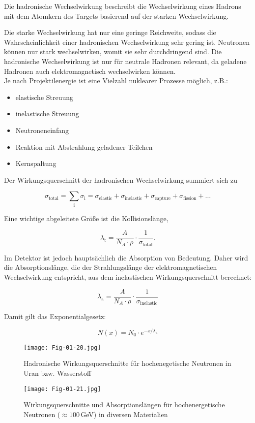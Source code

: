 Die hadronische Wechselwirkung beschreibt die Wechselwirkung eines Hadrons mit dem Atomkern des
Targets basierend auf der starken Wechselwirkung. 

\begin{figure}[H]
		\centering
		
\end{figure}

Die starke Wechselwirkung hat nur eine geringe Reichweite, sodass die Wahrscheinlichkeit einer
hadronischen Wechselwirkung sehr gering ist. Neutronen können nur stark wechselwirken, womit sie
sehr durchdringend sind. Die hadronische Wechselwirkung ist nur für neutrale Hadronen relevant, da
geladene Hadronen auch elektromagnetisch wechselwirken können. 
\\
Je nach Projektilenergie ist eine Vielzahl nuklearer Prozesse möglich, z.B.:

\begin{itemize}
  \item elastische Streuung
  \item inelastische Streuung
  \item Neutroneneinfang
  \item Reaktion mit Abstrahlung geladener Teilchen
  \item Kernspaltung
\end{itemize}

Der Wirkungsquerschnitt der hadronischen Wechselwirkung summiert sich zu

\[\sigma_\text{total} = \sum_\text{i} \sigma_\text{i} = \sigma_\text{elastic}+
\sigma_\text{inelastic}+ \sigma_\text{capture}+ \sigma_\text{fission} +\ldots\]

Eine wichtige abgeleitete Größe ist die Kollisionslänge,

\[ \lambda_\text{t} = \frac{A}{N_A\cdot\rho}\cdot \frac{1}{\sigma_\text{total}}. \]

Im Detektor ist jedoch hauptsächlich die Absorption von Bedeutung. Daher wird die Absorptionslänge,
die der Strahlungslänge der elektromagnetischen Wechselwirkung entspricht, aus dem inelastischen
Wirkungsquerschnitt berechnet:

\[ \lambda_\text{a} =  \frac{A}{N_A\cdot\rho}\cdot \frac{1}{\sigma_\text{inelastic}}\]

Damit gilt das Exponentialgesetz:

\[N(x) = N_0\cdot e^{-x/\lambda_\text{a}} \]

 
\begin{figure}[H]
	\centering
	\texttt{[image: Fig-01-20.jpg]}
	\caption{Hadronische Wirkungsquerschnitte für hochenegetische Neutronen in Uran bzw. Wasserstoff}
	\label{hadrwewi2}
\end{figure}

\begin{figure}[H]
	\centering
	\texttt{[image: Fig-01-21.jpg]}
	\caption{Wirkungsquerschnitte und Absorptionslängen für hochenergetische Neutronen ($\approx
	100\,$GeV) in diversen Materialien}
	\label{hadrwewitab}
\end{figure}
